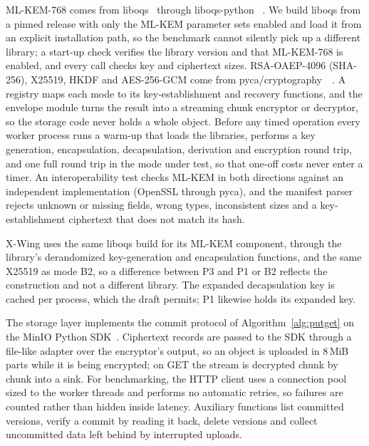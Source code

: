 \documentclass[conference]{IEEEtran}
\begin{document}
ML-KEM-768 comes from liboqs~\LiboqsVersion{} through liboqs-python~\LiboqsPyVersion{}
\cite{liboqs,liboqspython}. We build liboqs from a pinned release with only the ML-KEM parameter
sets enabled and load it from an explicit installation path, so the benchmark cannot silently pick up a different library; a start-up check verifies the library version and that ML-KEM-768 is enabled, and every call checks key and ciphertext sizes.
RSA-OAEP-4096 (SHA-256), X25519, HKDF and AES-256-GCM come from
pyca/cryptography~\CryptographyVersion{}~\cite{pyca}. A registry maps each mode to its
key-establishment and recovery functions, and the envelope module turns the result into a
streaming chunk encryptor or decryptor, so the storage code never holds a whole object. Before
any timed operation every worker process runs a warm-up that loads the libraries, performs a key generation, encapsulation, decapsulation, derivation and encryption round trip, and one full round trip in the mode under test, so that one-off costs never enter a timer.
An interoperability test checks ML-KEM in both directions against an independent implementation
(OpenSSL through pyca), and the manifest parser rejects unknown or missing fields, wrong types, inconsistent sizes and a key-establishment ciphertext that does not match its hash.

X-Wing uses the same liboqs build for its ML-KEM component, through the library's derandomized
key-generation and encapsulation functions, and the same X25519 as mode B2, so a difference
between P3 and P1 or B2 reflects the construction and not a different library. The expanded
decapsulation key is cached per process, which the draft permits; P1 likewise holds its expanded
key.

The storage layer implements the commit protocol of Algorithm~\ref{alg:putget} on the MinIO
Python SDK~\MinioPyVersion. Ciphertext records are passed to the SDK through a file-like adapter
over the encryptor's output, so an object is uploaded in 8\,MiB parts while it is being encrypted;
on GET the stream is decrypted chunk by chunk into a sink. For benchmarking, the HTTP client uses a connection pool sized to the worker threads and performs no automatic retries, so failures are counted rather
than hidden inside latency. Auxiliary functions list committed versions, verify a commit by reading
it back, delete versions and collect uncommitted data left behind by interrupted uploads.
\end{document}
